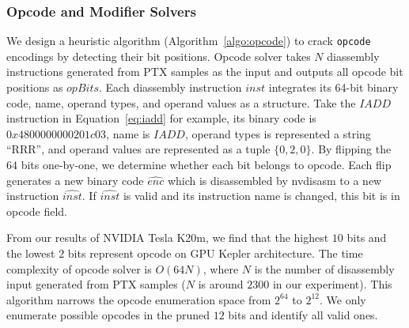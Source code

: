 \subsubsection{Opcode and Modifier Solvers}
We design a heuristic algorithm (Algorithm~\ref{algo:opcode}) to crack {\tt opcode} encodings by detecting their bit positions.
Opcode solver takes $N$ diassembly instructions generated from PTX samples as the input and outputs all opcode bit positions as $opBits$.
Each diassembly instruction $inst$ integrates its 64-bit binary code, name, operand types, and operand values as a structure.
Take the $IADD$ instruction in Equation~\ref{eq:iadd} for example, its binary code is $0x4800000000201c03$, name is $IADD$, operand types is represented a string ``RRR'', and operand values are represented as a tuple $\{ 0,2,0 \}$.
By flipping the 64 bits one-by-one, we determine whether each bit belongs to opcode.
Each flip generates a new binary code $\widehat{enc}$ which is disassembled by nvdisasm to a new instruction $\widehat{inst}$.
If $\widehat{inst}$ is valid and its instruction name is changed, this bit is in opcode field.


From our results of NVIDIA Tesla K20m, we find that the highest $10$ bits and the lowest $2$ bits represent opcode on GPU Kepler architecture.
The time complexity of opcode solver is $O(64N)$, where $N$ is the number of disassembly input generated from PTX samples ($N$ is around $2300$ in our experiment). This algorithm narrows the opcode enumeration space from $2^{64}$ to $2^{12}$. 
We only enumerate possible opcodes in the pruned $12$ bits and identify all valid ones.

